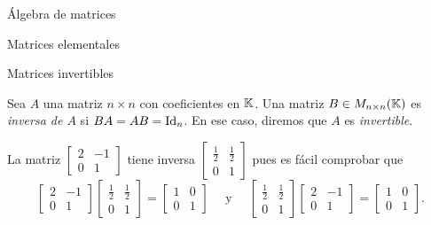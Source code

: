 \begin{chapter}{\'Algebra de matrices}
\begin{section}{Matrices elementales}
\begin{enumex}
            \end{enumex}

        \end{section}
        
        \begin{section}{Matrices invertibles}\label{seccion-matrices-invertibles}
            \begin{definicion} Sea $A$ una  matriz $n \times n$ con coeficientes en $\mathbb K$. Una matriz $B \in M_{n\times n}(\mathbb K)$  es \textit{inversa  de $A$} si $BA=AB=\operatorname{Id}_n$. En  ese caso,  diremos que  $A$ es \textit{invertible}.
            \end{definicion}
            
            \begin{ejemplo*}
                La matriz $\begin{bmatrix} 2&-1\\0&1\end{bmatrix}$ tiene inversa 
                $\begin{bmatrix} \frac12&\frac12\\0&1\end{bmatrix}$ pues es fácil comprobar que 
                \begin{equation*}
                \begin{bmatrix} 2&-1\\0&1\end{bmatrix}
                \begin{bmatrix} \frac12&\frac12\\0&1\end{bmatrix} =
                \begin{bmatrix} 1&0\\0&1\end{bmatrix}\quad\text{ y } \quad
                \begin{bmatrix} \frac12&\frac12\\0&1\end{bmatrix} 
                \begin{bmatrix} 2&-1\\0&1\end{bmatrix}=
                \begin{bmatrix} 1&0\\0&1\end{bmatrix}.
                \end{equation*}
            \end{ejemplo*}
 

\end{section}
\end{chapter}
